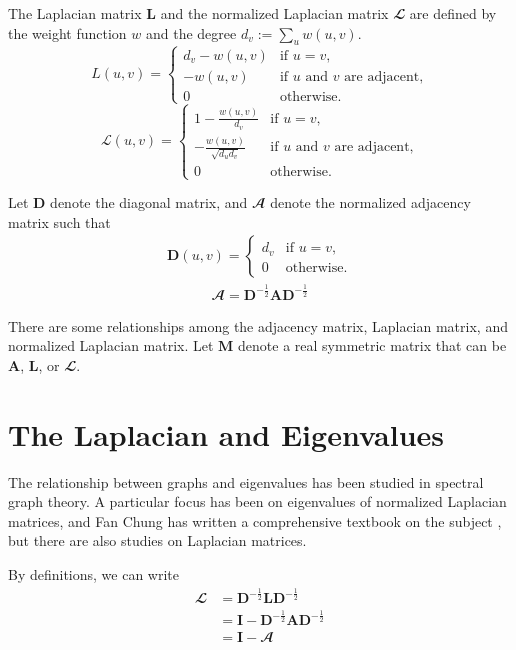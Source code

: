 \documentclass[senior,final,11pt]{iscs-thesis}
\begin{document}
The Laplacian matrix ${\mathbf L}$ and the normalized Laplacian matrix ${\mathbfcal L}$ are defined by the weight function $w$ and the degree $d_v:=\sum_{u} w(u,v)$.
\[
    L(u,v) = \begin{cases}
        d_v - w(u,v) & \text{if $u=v$}, \\
        - w(u,v) &  \text{if $u$ and $v$ are adjacent,} \\
        0   & \text{otherwise.}
        \end{cases}
\]
\[
    \mathcal{L}(u,v) = \begin{cases}
        1 - \frac{w(u,v)}{d_v} & \text{if $u=v$}, \\
        - \frac{w(u,v)}{\sqrt{d_u d_v}} &  \text{if $u$ and $v$ are adjacent,} \\
        0   & \text{otherwise.}
        \end{cases}
\]

Let ${\mathbf D}$ denote the diagonal matrix, and ${\mathbfcal A}$ denote the normalized adjacency matrix such that
\begin{align*}
    \mathbf{D}(u,v) = \begin{cases}
        d_v & \text{if $u=v$}, \\
        0   & \text{otherwise.}
        \end{cases}
\end{align*}
\begin{align*}
    {\mathbfcal A} = \mathbf{D}^{-\frac{1}{2}}\mathbf{A}\mathbf{D}^{-\frac{1}{2}}
\end{align*}


There are some relationships among the adjacency matrix, Laplacian matrix, and  normalized Laplacian matrix.
Let ${\mathbf M}$ denote a real symmetric matrix that can be ${\mathbf A}$, ${\mathbf L}$, or ${\mathbfcal L}$.

\section{The Laplacian and Eigenvalues}
The relationship between graphs and eigenvalues has been studied in spectral graph theory. A particular focus has been on eigenvalues of normalized Laplacian matrices, and Fan Chung has written a comprehensive textbook on the subject \cite{chung1997spectral}, but there are also studies on Laplacian matrices.

By definitions, we can write
\begin{align}
    \mathbfcal{L} &= \mathbf{D}^{-\frac{1}{2}}\mathbf{L}\mathbf{D}^{-\frac{1}{2}}\\
        &= \mathbf{I} - \mathbf{D}^{-\frac{1}{2}}\mathbf{A}\mathbf{D}^{-\frac{1}{2}} \\
        &= \mathbf{I} - {\mathbfcal A}
\end{align}
\end{document}
